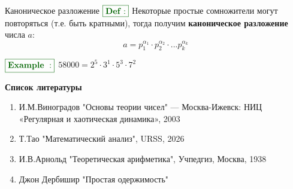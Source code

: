 \documentclass[8pt, aspectratio=169]{beamer}
\newcommand{\Def}{{\color{darkgreen}\boxed{\color{darkgreen}\mathbf{Def:}}}}
\newcommand{\Ex}[1]{{\color{darkgreen}\boxed{\color{darkgreen}\mathbf{Example~#1:}}}}
\begin{document}
\begin{frame}{Каноническое разложение}
$\Def$ Некоторые простые сомножители могут повторяться (т.е. быть кратными), тогда получим \textbf{каноническое разложение} числа $a$:
\[
a = p_1^{\alpha_1} \cdot p_2^{\alpha_2} \cdot ... p_k^{\alpha_k}
\]


$\Ex{}$  $58000 = 2^5\cdot 3^1 \cdot 5^3 \cdot 7^2$
\end{frame}

\begin{frame}{\textbf{Список литературы}}
\begin{enumerate}
\item И.М.Виноградов "Основы теории чисел" — Москва-Ижевск: НИЦ «Регулярная и хаотическая динамика», 2003
\item Т.Тао "Математический анализ", URSS, 2026
\item И.В.Арнольд "Теоретическая арифметика", Учпедгиз, Москва, 1938
\item Джон Дербишир "Простая одержимость"
\end{enumerate}
\end{frame}
\end{document}
